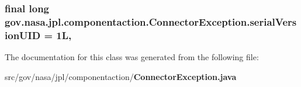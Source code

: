 \subsubsection[{serial\+Version\+U\+ID}]{\setlength{\rightskip}{0pt plus 5cm}final long gov.\+nasa.\+jpl.\+componentaction.\+Connector\+Exception.\+serial\+Version\+U\+ID = 1L\hspace{0.3cm}{\ttfamily [static]}, {\ttfamily [private]}}\label{classgov_1_1nasa_1_1jpl_1_1componentaction_1_1_connector_exception_a95f0f185bf2d2f3806705333dc3a9787}


The documentation for this class was generated from the following file\+:\begin{DoxyCompactItemize}
\item 
src/gov/nasa/jpl/componentaction/{\bf Connector\+Exception.\+java}\end{DoxyCompactItemize}
